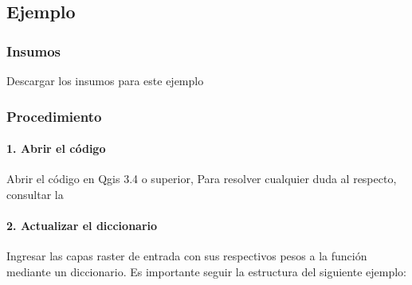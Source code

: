\documentclass[letterpaper,10pt,spanish]{sphinxmanual}
\begin{document}
\subsection{Ejemplo}
\label{\detokenize{owa:ejemplo}}

\subsubsection{Insumos}
\label{\detokenize{owa:insumos}}
Descargar los insumos para este ejemplo 


\subsubsection{Procedimiento}
\label{\detokenize{owa:procedimiento}}

\paragraph{1. Abrir el código}
\label{\detokenize{owa:abrir-el-codigo}}
Abrir el código  en Qgis 3.4 o superior,
Para resolver cualquier duda al respecto, consultar la 

\noindent{}


\paragraph{2. Actualizar el diccionario}
\label{\detokenize{owa:actualizar-el-diccionario}}
Ingresar las capas raster de entrada con sus respectivos pesos
a la función mediante un diccionario. Es importante seguir la
estructura del siguiente ejemplo:
\end{document}

